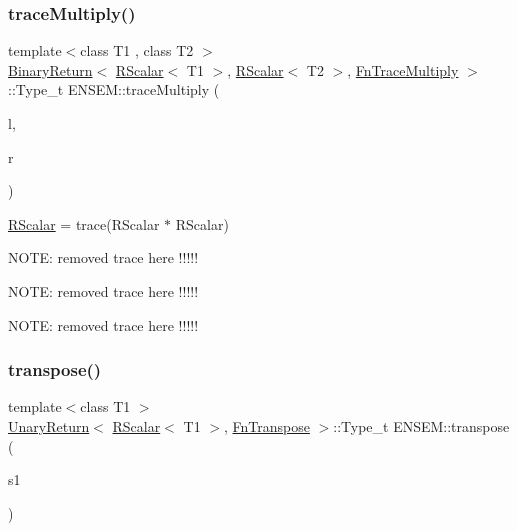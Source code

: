 \subsubsection{\texorpdfstring{traceMultiply()}{traceMultiply()}}
{\footnotesize\ttfamily template$<$class T1 , class T2 $>$ \\
\mbox{\hyperlink{structENSEM_1_1BinaryReturn}{Binary\+Return}}$<$ \mbox{\hyperlink{classENSEM_1_1RScalar}{R\+Scalar}}$<$ T1 $>$, \mbox{\hyperlink{classENSEM_1_1RScalar}{R\+Scalar}}$<$ T2 $>$, \mbox{\hyperlink{structENSEM_1_1FnTraceMultiply}{Fn\+Trace\+Multiply}} $>$\+::Type\+\_\+t E\+N\+S\+E\+M\+::trace\+Multiply (\begin{DoxyParamCaption}\item[{const \mbox{\hyperlink{classENSEM_1_1RScalar}{R\+Scalar}}$<$ T1 $>$ \&}]{l,  }\item[{const \mbox{\hyperlink{classENSEM_1_1RScalar}{R\+Scalar}}$<$ T2 $>$ \&}]{r }\end{DoxyParamCaption})\hspace{0.3cm}{\ttfamily [inline]}}



\mbox{\hyperlink{classENSEM_1_1RScalar}{R\+Scalar}} = trace(\+R\+Scalar $\ast$ R\+Scalar) 

N\+O\+TE\+: removed trace here !!!!!

N\+O\+TE\+: removed trace here !!!!!

N\+O\+TE\+: removed trace here !!!!! \mbox{\label{group__rscalar_ga0a32a83382be7e92236abd5dc654c18d}} 
\subsubsection{\texorpdfstring{transpose()}{transpose()}}
{\footnotesize\ttfamily template$<$class T1 $>$ \\
\mbox{\hyperlink{structENSEM_1_1UnaryReturn}{Unary\+Return}}$<$ \mbox{\hyperlink{classENSEM_1_1RScalar}{R\+Scalar}}$<$ T1 $>$, \mbox{\hyperlink{structENSEM_1_1FnTranspose}{Fn\+Transpose}} $>$\+::Type\+\_\+t E\+N\+S\+E\+M\+::transpose (\begin{DoxyParamCaption}\item[{const \mbox{\hyperlink{classENSEM_1_1RScalar}{R\+Scalar}}$<$ T1 $>$ \&}]{s1 }\end{DoxyParamCaption})\hspace{0.3cm}{\ttfamily [inline]}}

